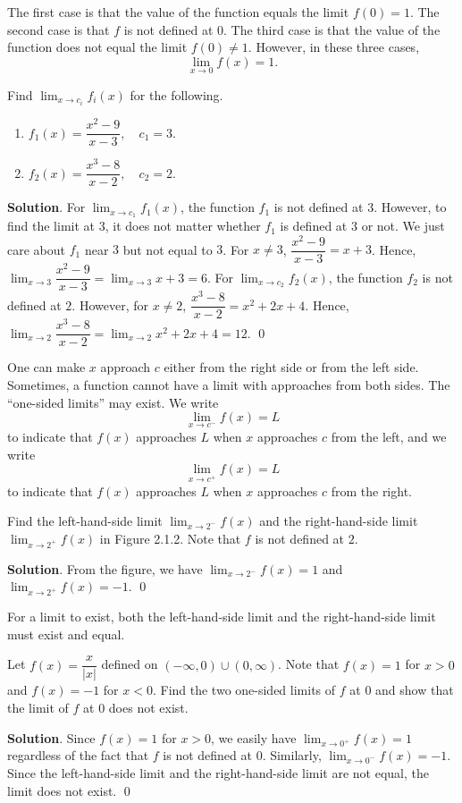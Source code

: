 \documentclass[11pt]{book}
\theoremstyle{break}
\theoremstyle{no_label}
\numberwithin{equation}{section}
\begin{document}
The first case is that the value of the function equals the limit $f(0)=1$. The second case is that $f$ is not defined at $0$. The third case is that the value of the function does not equal the limit $f(0)\ne 1$. However, in these three cases, $$\lim_{x\to 0}f(x)=1.$$

\begin{example}
    Find $\displaystyle\lim_{x\to c_i}f_i(x)$ for the following.
    \begin{enumerate}
        \item $f_1(x)=\dfrac{x^2-9}{x-3}, \quad c_1=3$.
        \item $f_2(x)=\dfrac{x^3-8}{x-2}, \quad c_2=2$.
    \end{enumerate}
\end{example}
\textbf{Solution}. For $\displaystyle\lim_{x\to c_1}f_1(x)$, the function $f_1$ is not defined at $3$. However, to find the limit at $3$, it does not matter whether $f_1$ is defined at $3$ or not. We just care about $f_1$ near $3$ but not equal to $3$. For $x\ne 3$, $\dfrac{x^2-9}{x-3}=x+3$. Hence, $\displaystyle\lim_{x\to 3}\dfrac{x^2-9}{x-3}=\lim_{x\to 3}x+3=6$. For $\displaystyle\lim_{x\to c_2}f_2(x)$, the function $f_2$ is not defined at $2$. However, for $x\ne 2$, $\dfrac{x^3-8}{x-2}=x^2+2x+4$. Hence, $\displaystyle\lim_{x\to 2}\dfrac{x^3-8}{x-2}=\lim_{x\to 2}x^2+2x+4=12$. \qed

One can make $x$ approach $c$ either from the right side or from the left side. Sometimes, a function cannot have a limit with approaches from both sides. The ``one-sided limits'' may exist. We write $$\lim_{x\to c^-}f(x)=L$$ to indicate that $f(x)$ approaches $L$ when $x$ approaches $c$ from the left, and we write $$\lim_{x\to c^+}f(x)=L$$ to indicate that $f(x)$ approaches $L$ when $x$ approaches $c$ from the right.

\begin{example}
    Find the left-hand-side limit $\displaystyle\lim_{x\to 2^-}f(x)$ and the right-hand-side limit $\displaystyle\lim_{x\to 2^+}f(x)$ in Figure 2.1.2. Note that $f$ is not defined at $2$.
\end{example}
\textbf{Solution}. From the figure, we have $\displaystyle\lim_{x\to 2^-}f(x)=1$ and $\displaystyle\lim_{x\to 2^+}f(x)=-1$. \qed

For a limit to exist, both the left-hand-side limit and the right-hand-side limit must exist and equal.

\begin{example}
    Let $f(x)=\dfrac{x}{|x|}$ defined on $(-\infty, 0)\cup(0, \infty)$. Note that $f(x)=1$ for $x>0$ and $f(x)=-1$ for $x<0$. Find the two one-sided limits of $f$ at $0$ and show that the limit of $f$ at $0$ does not exist.
\end{example}
\textbf{Solution}. Since $f(x)=1$ for $x>0$, we easily have $\displaystyle\lim_{x\to 0^+}f(x)=1$ regardless of the fact that $f$ is not defined at $0$. Similarly, $\displaystyle\lim_{x\to 0^-}f(x)=-1$. Since the left-hand-side limit and the right-hand-side limit are not equal, the limit does not exist. \qed
\end{document}
